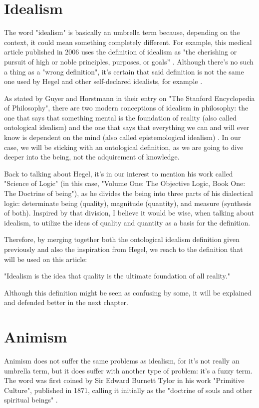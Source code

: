 \section{Idealism}
The word "idealism" is basically an umbrella term because, depending on the context, it could mean
something completely different. For example, this medical article published in 2006 uses the
definition of idealism as "the cherishing or pursuit of high or noble principles, purposes, or
goals” \cite{Smith2006}. Although there's no such a thing as a "wrong definition", it's certain
that said definition is not the same one used by Hegel and other self-declared idealists, for
example \cite{Beiser2009}.

As stated by Guyer and Horstmann in their entry on "The Stanford Encyclopedia of Philosophy",
there are two modern conceptions of idealism in philosophy: the one that says that something
mental is the foundation of reality (also called ontological idealism) and the one that says
that everything we can and will ever know is dependent on the mind (also called epistemological
idealism) \cite{Guyer2023}. In our case, we will be sticking with an ontological definition, as
we are going to dive deeper into the being, not the adquirement of knowledge.

Back to talking about Hegel, it's in our interest to mention his work called "Science of Logic"
(in this case, "Volume One: The Objective Logic, Book One: The Doctrine of being"), as he divides the
being into three parts of his dialectical logic: determinate being (quality), magnitude (quantity),
and measure (synthesis of both). Inspired by that division, I believe it would be wise, when talking
about idealism, to utilize the ideas of quality and quantity as a basis for the definition.

Therefore, by merging together both the ontological idealism definition given previously and also
the inspiration from Hegel, we reach to the definition that will be used on this article:

\begin{center}
    \itshape
    \parbox{0.7\textwidth}{
    "Idealism is the idea that quality is the ultimate foundation of all reality." 
    }
\end{center}

Although this definition might be seen as confusing by some, it will be explained and defended better
in the next chapter.

\section{Animism}
Animism does not suffer the same problems as idealism, for it's not really an umbrella term, but it does
suffer with another type of problem: it's a fuzzy term. The word was first coined by Sir Edward Burnett
Tylor in his work "Primitive Culture", published in 1871, calling it initially as the "doctrine of souls
and other spiritual beings" \cite{Tylor1871}.

